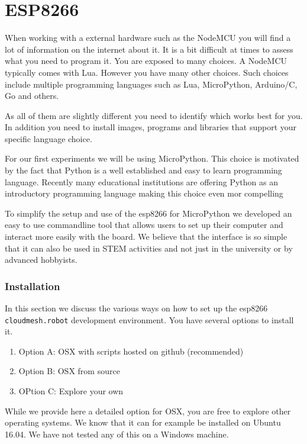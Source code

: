 \chapter{ESP8266}\label{esp8266}

\FILENAME

When working with a external hardware such as the NodeMCU you will find
a lot of information on the internet about it. It is a bit difficult at
times to assess what you need to program it. You are exposed to many
choices. A NodeMCU typically comes with Lua. However you have many other
choices. Such choices include multiple programming languages such as
Lua, MicroPython, Arduino/C, Go and others.

As all of them are slightly different you need to identify which works
best for you. In addition you need to install images, programs and
libraries that support your specific language choice.

For our first experiments we will be using MicroPython. This choice is
motivated by the fact that Python is a well established and easy to
learn programming language. Recently many educational institutions are
offering Python as an introductory programming language making this
choice even mor compelling

To simplify the setup and use of the esp8266 for MicroPython we
developed an easy to use commandline tool that allows users to set up
their computer and interact more easily with the board. We believe that
the interface is so simple that it can also be used in STEM activities
and not just in the university or by advanced hobbyists.

\subsection{Installation}\label{installation}

In this section we discuss the various ways on how to set up the esp8266
\texttt{cloudmesh.robot} development environment. You have several
options to install it.

\begin{enumerate}
\item
  Option A: OSX with scripts hosted on github (recommended)
\item
  Option B: OSX from source
\item
  OPtion C: Explore your own
\end{enumerate}

While we provide here a detailed option for OSX, you are free to explore
other operating systems. We know that it can for example be installed on
Ubuntu 16.04. We have not tested any of this on a Windows machine.

